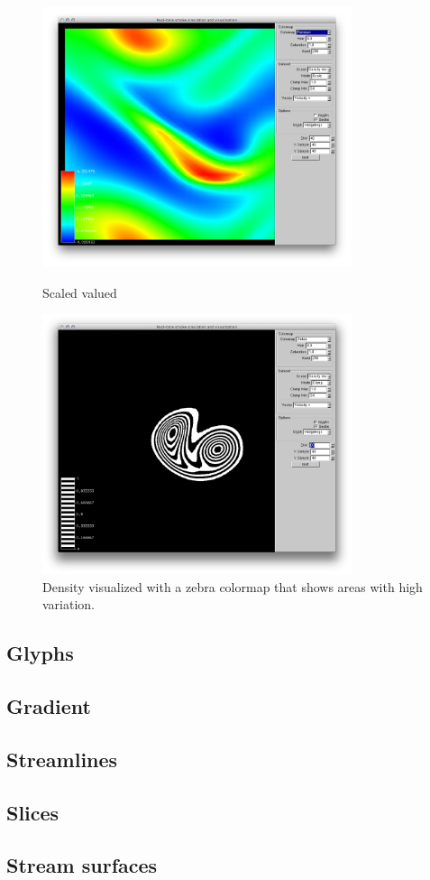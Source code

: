 \begin{figure}[htbp]
\centering
\begin{minipage}[t]{0.48\textwidth}
        \includegraphics[height=3in]{figures/colormaps/rainbowSmokeScaled.png}
\caption{Scaled valued}
\label{fig:revised:modelingLanguages}
\end{minipage}\hspace{.04\textwidth}%
\begin{minipage}[t]{0.48\textwidth}
        \includegraphics[height=3in]{figures/colormaps/zebraSmoke.png}
    \caption{Density visualized with a zebra colormap that shows areas with high variation.}
    \label{fig:revised:reqFormat}
\end{minipage}
\end{figure}


\subsection{Glyphs}
\subsection{Gradient}
\subsection{Streamlines}
\subsection{Slices}
\subsection{Stream surfaces}